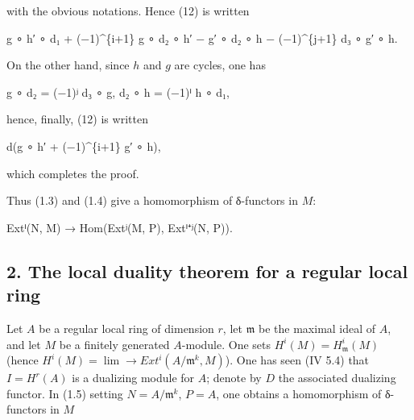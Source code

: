 \documentclass[
]{article}
\newenvironment{Shaded}{}{}
\newcommand{\NormalTok}[1]{#1}
\begin{document}
with the obvious notations. Hence (12) is written

\begin{Shaded}
\begin{Highlighting}[]
\NormalTok{g ∘ h′ ∘ d₁ + (−1)\^{}\{i+1\} g ∘ d₂ ∘ h′ − g′ ∘ d₂ ∘ h − (−1)\^{}\{j+1\} d₃ ∘ g′ ∘ h.}
\end{Highlighting}
\end{Shaded}

On the other hand, since \(h\) and \(g\) are cycles, one has

\begin{Shaded}
\begin{Highlighting}[]
\NormalTok{g ∘ d₂ = (−1)ʲ d₃ ∘ g,}
\NormalTok{d₂ ∘ h = (−1)ⁱ h ∘ d₁,}
\end{Highlighting}
\end{Shaded}

hence, finally, (12) is written

\begin{Shaded}
\begin{Highlighting}[]
\NormalTok{d(g ∘ h′ + (−1)\^{}\{i+1\} g′ ∘ h),}
\end{Highlighting}
\end{Shaded}

which completes the proof.

Thus (1.3) and (1.4) give a homomorphism of δ-functors in \(M\):

\begin{Shaded}
\begin{Highlighting}[]
\NormalTok{Extⁱ(N, M) → Hom(Extʲ(M, P), Extⁱ⁺ʲ(N, P)).}
\end{Highlighting}
\end{Shaded}

\subsection{2. The local duality theorem for a regular local
ring}\label{the-local-duality-theorem-for-a-regular-local-ring}

Let \(A\) be a regular local ring of dimension \(r\), let
\(\mathfrak{m}\) be the maximal ideal of \(A\), and let \(M\) be a
finitely generated \(A\)-module. One sets
\(H^{i}(M) = H^{i}_{\mathfrak{m}}(M)\) (hence
\(H^{i}(M) = \lim\to Ext^{i}(A/\mathfrak{m}^{k}, M)\)). One has seen (IV
5.4) that \(I = H^{r}(A)\) is a dualizing module for \(A\); denote by
\(D\) the associated dualizing functor. In (1.5) setting
\(N = A/\mathfrak{m}^{k}\), \(P = A\), one obtains a homomorphism of
δ-functors in \(M\)
\end{document}
